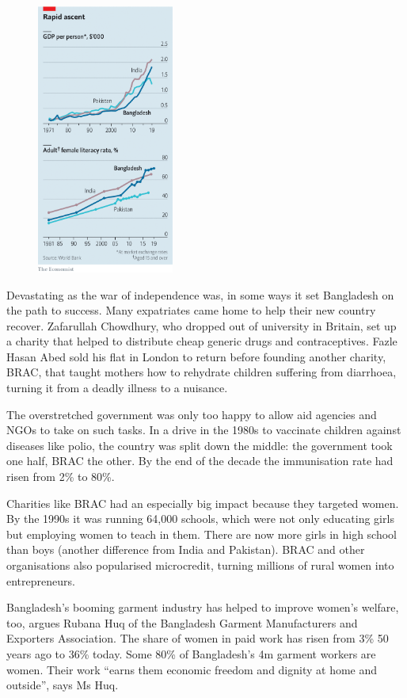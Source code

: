 \documentclass{article}
\begin{document}
\begin{figure}[h]
\centering
\includegraphics[width=0.4\textwidth]{images/20210327_ASC297_0.png}
\end{figure}


Devastating as the war of independence was, in some ways it set Bangladesh on the path to success. Many expatriates came home to help their new country recover. Zafarullah Chowdhury, who dropped out of university in Britain, set up a charity that helped to distribute cheap generic drugs and contraceptives. Fazle Hasan Abed sold his flat in London to return before founding another charity, BRAC, that taught mothers how to rehydrate children suffering from diarrhoea, turning it from a deadly illness to a nuisance. 

The overstretched government was only too happy to allow aid agencies and NGOs to take on such tasks. In a drive in the 1980s to vaccinate children against diseases like polio, the country was split down the middle: the government took one half, BRAC the other. By the end of the decade the immunisation rate had risen from 2\% to 80\%. 

Charities like BRAC had an especially big impact because they targeted women. By the 1990s it was running 64,000 schools, which were not only educating girls but employing women to teach in them. There are now more girls in high school than boys (another difference from India and Pakistan). BRAC and other organisations also popularised microcredit, turning millions of rural women into entrepreneurs. 

Bangladesh's booming garment industry has helped to improve women's welfare, too, argues Rubana Huq of the Bangladesh Garment Manufacturers and Exporters Association. The share of women in paid work has risen from 3\% 50 years ago to 36\% today. Some 80\% of Bangladesh's 4m garment workers are women. Their work ``earns them economic freedom and dignity at home and outside'', says Ms Huq. 
\end{document}
